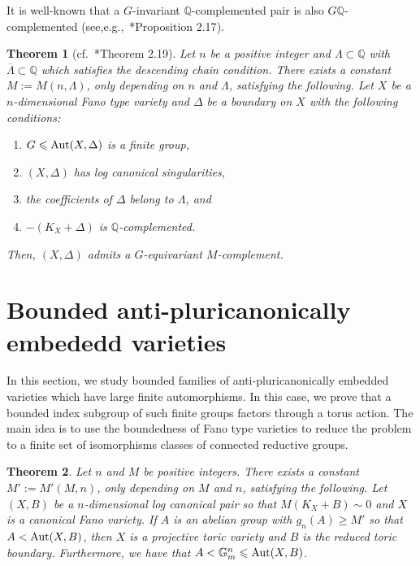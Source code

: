 \documentclass{amsart}
\renewcommand{\qq}{\mathbb{Q}}
\newtheorem{theorem}{Theorem}[section]
\theoremstyle{remark}
\numberwithin{equation}{section}
\begin{document}
It is well-known that a $G$-invariant $\qq$-complemented pair is also
$G\qq$-complemented (see,e.g.,~\cite{Mor20}*{Proposition 2.17}).

\begin{theorem}[cf.~\cite{Mor20}*{Theorem 2.19}]\label{thm:G-equiv-complement}
Let $n$ be a positive integer and $\Lambda\subset \qq$ with $\overline{\Lambda}\subset \qq$ which satisfies the descending chain condition.
There exists a constant $M:=M(n,\Lambda)$, only depending on $n$ and $\Lambda$, 
satisfying the following.
Let $X$ be a $n$-dimensional Fano type variety and $\Delta$ be a boundary on $X$ 
with the following conditions:
\begin{enumerate}
\item $G\leqslant {\rm Aut}(X,\Delta)$ is a finite group, 
\item $(X,\Delta)$ has log canonical singularities,
\item the coefficients of $\Delta$ belong to $\Lambda$, and
\item $-(K_X+\Delta)$ is $\qq$-complemented.
\end{enumerate}
Then, $(X,\Delta)$ admits a $G$-equivariant $M$-complement.
\end{theorem}

\section{Bounded anti-pluricanonically embededd varieties}\label{sec:bounded}
In this section, we study bounded families of anti-pluricanonically embedded varieties which have large finite automorphisms.
In this case, we prove that a bounded index subgroup of such finite groups factors through a torus action. The main idea is to use the boundedness of Fano type varieties
to reduce the problem to a finite set of isomorphisms classes of connected reductive groups.

\begin{theorem}\label{thm:bounded-anti-pluricanonically-embedded-varieties}
Let $n$ and $M$ be positive integers.
There exists a constant $M':=M'(M,n)$, only depending on $M$ and $n$, satisfying the following.
Let $(X,B)$ be a $n$-dimensional log canonical pair so that
$M(K_X+B)\sim 0$ and
$X$ is a canonical Fano variety.
If $A$ is an abelian group with $g_n(A)\geq M'$ so that $A<{\rm Aut}(X,B)$, then
$X$ is a projective toric variety
and $B$ is the reduced toric boundary.
Furthermore,
we have that $A<\mathbb{G}_m^n\leqslant {\rm Aut}(X,B)$.
\end{theorem}
\end{document}
